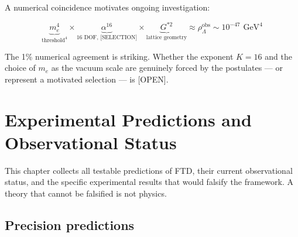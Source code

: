 \documentclass[
  11pt,
  letterpaper,
  twoside,
  openany]{book}
\makeatletter
\let\orig@section\section
\renewcommand{\section}{\needspace{8\baselineskip}\orig@section}
\makeatother
\begin{document}
A numerical coincidence motivates ongoing investigation:

\[
\underbrace{m_e^4}_{\text{threshold}^4} \times \underbrace{\alpha^{16}}_{\text{16 DOF, [SELECTION]}} \times \underbrace{G^{*2}}_{\text{lattice geometry}} \approx \rho_\Lambda^\text{obs} \sim 10^{-47} \text{ GeV}^4
\]

The 1\% numerical agreement is striking. Whether the exponent \(K = 16\)
and the choice of \(m_e\) as the vacuum scale are genuinely forced by
the postulates --- or represent a motivated selection --- is {[}OPEN{]}.

\chapter{Experimental Predictions and Observational
Status}\label{sec-predictions}

This chapter collects all testable predictions of FTD, their current
observational status, and the specific experimental results that would
falsify the framework. A theory that cannot be falsified is not physics.

\section{Precision predictions}\label{precision-predictions}
\end{document}
